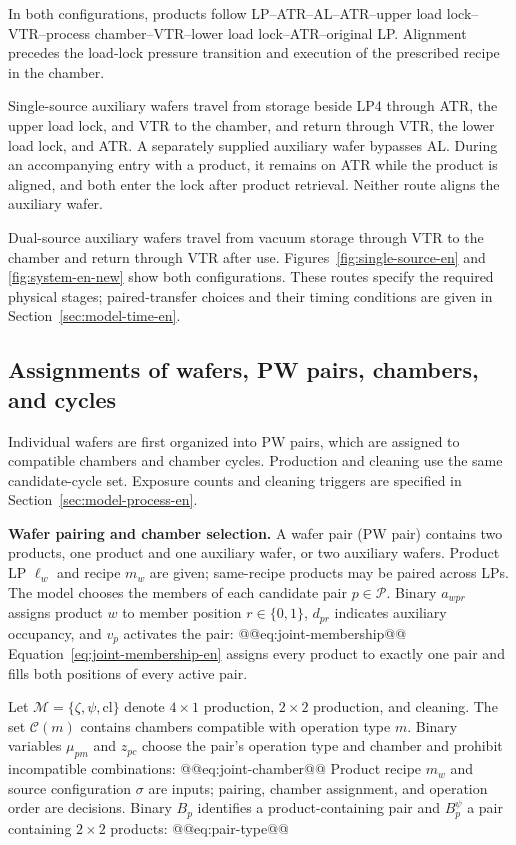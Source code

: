 In both configurations, products follow LP--ATR--AL--ATR--upper load lock--VTR--process chamber--VTR--lower load lock--ATR--original LP. Alignment precedes the load-lock pressure transition and execution of the prescribed recipe in the chamber.

Single-source auxiliary wafers travel from storage beside LP4 through ATR, the upper load lock, and VTR to the chamber, and return through VTR, the lower load lock, and ATR. A separately supplied auxiliary wafer bypasses AL. During an accompanying entry with a product, it remains on ATR while the product is aligned, and both enter the lock after product retrieval. Neither route aligns the auxiliary wafer.

Dual-source auxiliary wafers travel from vacuum storage through VTR to the chamber and return through VTR after use. Figures~\ref{fig:single-source-en} and \ref{fig:system-en-new} show both configurations. These routes specify the required physical stages; paired-transfer choices and their timing conditions are given in Section~\ref{sec:model-time-en}.

\subsection{Assignments of wafers, PW pairs, chambers, and cycles}
\label{sec:model-assignment-en}

Individual wafers are first organized into PW pairs, which are assigned to compatible chambers and chamber cycles. Production and cleaning use the same candidate-cycle set. Exposure counts and cleaning triggers are specified in Section~\ref{sec:model-process-en}.

\noindent\textbf{Wafer pairing and chamber selection.}
A wafer pair (PW pair) contains two products, one product and one auxiliary wafer, or two auxiliary wafers. Product LP $\ell_w$ and recipe $m_w$ are given; same-recipe products may be paired across LPs. The model chooses the members of each candidate pair $p\in\mathcal P$. Binary $a_{wpr}$ assigns product $w$ to member position $r\in\{0,1\}$, $d_{pr}$ indicates auxiliary occupancy, and $v_p$ activates the pair:
@@eq:joint-membership@@
Equation~\eqref{eq:joint-membership-en} assigns every product to exactly one pair and fills both positions of every active pair.

Let $\mathcal M=\{\zeta,\psi,\mathrm{cl}\}$ denote $4\times1$ production, $2\times2$ production, and cleaning. The set $\mathcal C(m)$ contains chambers compatible with operation type $m$. Binary variables $\mu_{pm}$ and $z_{pc}$ choose the pair's operation type and chamber and prohibit incompatible combinations:
@@eq:joint-chamber@@
Product recipe $m_w$ and source configuration $\sigma$ are inputs; pairing, chamber assignment, and operation order are decisions. Binary $B_p$ identifies a product-containing pair and $B_p^{\psi}$ a pair containing $2\times2$ products:
@@eq:pair-type@@

